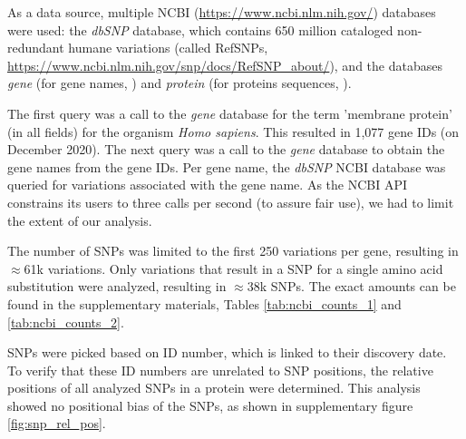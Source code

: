 
As a data source, multiple
NCBI (\url{https://www.ncbi.nlm.nih.gov/}) databases were used: 
the \emph{dbSNP} \cite{sherry2001dbsnp} database,
which contains 650 million 
cataloged non-redundant humane variations (called RefSNPs,
\url{https://www.ncbi.nlm.nih.gov/snp/docs/RefSNP_about/}), and the databases \emph{gene} (for gene names, \cite{brown2015gene})
and \emph{protein} (for proteins sequences, \cite{sayers2010database}).


The first query was a call to the \emph{gene} database for the 
term 'membrane protein' (in all fields) 
for the organism \emph{Homo sapiens}.
This resulted in 1,077 gene IDs (on December 2020).
The next query was a call to the \emph{gene} database 
to obtain the gene names from the gene IDs.
Per gene name, the \emph{dbSNP} NCBI database was queried for 
variations associated with the gene name. 
As the NCBI API constrains its users to three calls per second
(to assure fair use), we had to limit the extent of our analysis.

The number of SNPs was limited to the first 250 variations per gene,
resulting in $\approx$61k variations.
Only variations that result in a SNP for
a single amino acid substitution were analyzed, resulting in $\approx$38k SNPs.
The exact amounts can be found in the supplementary materials,
Tables \ref{tab:ncbi_counts_1} and \ref{tab:ncbi_counts_2}.

%
SNPs were picked based on ID number, which is linked to their discovery date. To verify that these ID numbers are unrelated to SNP positions, the relative positions of all analyzed SNPs in a protein were determined. This analysis showed no positional bias of the SNPs, as shown in supplementary figure \ref{fig:snp_rel_pos}.

